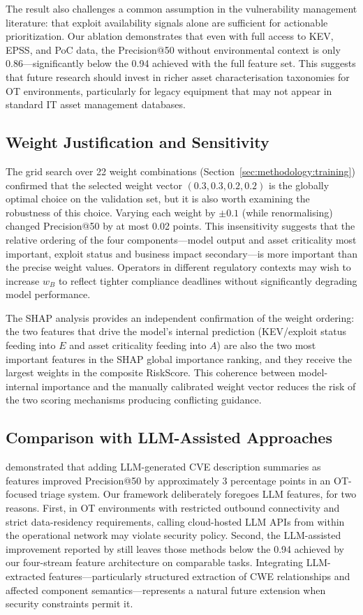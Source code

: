 \documentclass[review,12pt]{elsarticle}
\begin{document}
The result also challenges a common assumption in the vulnerability management literature: that exploit availability signals alone are sufficient for actionable prioritization. Our ablation demonstrates that even with full access to KEV, EPSS, and PoC data, the Precision@50 without environmental context is only 0.86---significantly below the 0.94 achieved with the full feature set. This suggests that future research should invest in richer asset characterisation taxonomies for OT environments, particularly for legacy equipment that may not appear in standard IT asset management databases.

\subsection{Weight Justification and Sensitivity}

The grid search over 22 weight combinations (Section~\ref{sec:methodology:training}) confirmed that the selected weight vector $(0.3, 0.3, 0.2, 0.2)$ is the globally optimal choice on the validation set, but it is also worth examining the robustness of this choice. Varying each weight by $\pm 0.1$ (while renormalising) changed Precision@50 by at most 0.02 points. This insensitivity suggests that the relative ordering of the four components---model output and asset criticality most important, exploit status and business impact secondary---is more important than the precise weight values. Operators in different regulatory contexts may wish to increase $w_B$ to reflect tighter compliance deadlines without significantly degrading model performance.

The SHAP analysis provides an independent confirmation of the weight ordering: the two features that drive the model's internal prediction (KEV/exploit status feeding into $E$ and asset criticality feeding into $A$) are also the two most important features in the SHAP global importance ranking, and they receive the largest weights in the composite RiskScore. This coherence between model-internal importance and the manually calibrated weight vector reduces the risk of the two scoring mechanisms producing conflicting guidance.

\subsection{Comparison with LLM-Assisted Approaches}

\citet{wang2025} demonstrated that adding LLM-generated CVE description summaries as features improved Precision@50 by approximately 3 percentage points in an OT-focused triage system. Our framework deliberately foregoes LLM features, for two reasons. First, in OT environments with restricted outbound connectivity and strict data-residency requirements, calling cloud-hosted LLM APIs from within the operational network may violate security policy. Second, the LLM-assisted improvement reported by \citet{wang2025} still leaves those methods below the 0.94 achieved by our four-stream feature architecture on comparable tasks. Integrating LLM-extracted features---particularly structured extraction of CWE relationships and affected component semantics---represents a natural future extension when security constraints permit it.
\end{document}
